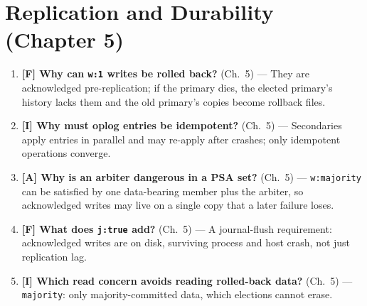 \section{Replication and Durability (Chapter 5)}
\begin{enumerate}
    \item \textbf{[F] Why can \texttt{w:1} writes be rolled back?} (Ch.~5) --- They are acknowledged pre-replication; if the primary dies, the elected primary's history lacks them and the old primary's copies become rollback files.
    \item \textbf{[I] Why must oplog entries be idempotent?} (Ch.~5) --- Secondaries apply entries in parallel and may re-apply after crashes; only idempotent operations converge.
    \item \textbf{[A] Why is an arbiter dangerous in a PSA set?} (Ch.~5) --- \texttt{w:majority} can be satisfied by one data-bearing member plus the arbiter, so acknowledged writes may live on a single copy that a later failure loses.
    \item \textbf{[F] What does \texttt{j:true} add?} (Ch.~5) --- A journal-flush requirement: acknowledged writes are on disk, surviving process and host crash, not just replication lag.
    \item \textbf{[I] Which read concern avoids reading rolled-back data?} (Ch.~5) --- \texttt{majority}: only majority-committed data, which elections cannot erase.
\end{enumerate}

